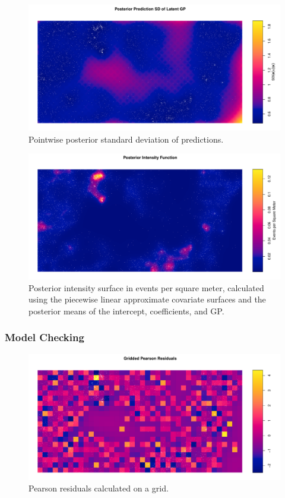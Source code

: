 \documentclass[]{interact}
\begin{document}
\begin{figure}[h]
\includegraphics[width=\textwidth]{figures/bei_sd.pdf}
\caption{Pointwise posterior standard deviation of predictions.}
\label{beisd}
\end{figure}

\begin{figure}[h]
\includegraphics[width=\textwidth]{figures/bei_intensity.pdf}
\caption{Posterior intensity surface in events per square meter, calculated
using the piecewise linear approximate covariate surfaces and the posterior
means of the intercept, coefficients, and GP.}
\label{beiintensity}
\end{figure}


\subsubsection{Model Checking}

\begin{figure}[h]
\includegraphics[width=\textwidth]{figures/bei_residuals.pdf}
\caption{Pearson residuals calculated on a grid.}
\label{beiresiduals}
\end{figure}
\end{document}
